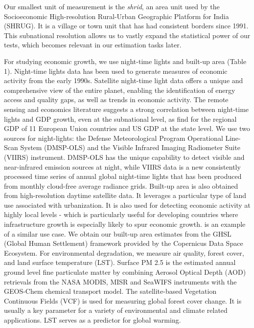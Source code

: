 \documentclass[a4paper,12pt]{article}
\begin{document}
Our smallest unit of measurement is the \textit{shrid}, an area unit used by the Socioeconomic High-resolution Rural-Urban Geographic Platform for India (SHRUG). It is a village or town unit that has had consistent borders since 1991. This subnational resolution allows us to vastly expand the statistical power of our tests, which becomes relevant in our estimation tasks later.

For studying economic growth, we use night-time lights and built-up area (Table 1). Night-time lights data has been used to generate measures of economic activity from the early 1990s. Satellite night-time light data offers a unique and comprehensive view of the entire planet, enabling the identification of energy access and quality gaps, as well as trends in economic activity. The remote sensing and economics literature suggests a strong correlation between night-time lights and GDP growth, even at the subnational level, as \textcite{doll2006} find for the regional GDP of 11 European Union countries and US GDP at the state level. We use two sources for night-lights: the Defense Meteorological Program Operational Line-Scan System (DMSP-OLS) and the Visible Infrared Imaging Radiometer Suite (VIIRS) instrument. DMSP-OLS has the unique capability to detect visible and near-infrared emission sources at night, while VIIRS data is a new consistently processed time series of annual global night-time lights that has been produced from monthly cloud-free average radiance grids.
Built-up area is also obtained from high-resolution daytime satellite data. It leverages a particular type of land use associated with urbanization. It is also used for detecting economic activity at highly local levels - which is particularly useful for developing countries where infrastructure growth is especially likely to spur economic growth. \textcite{baragwanath2021} is an example of a similar use case. We obtain our built-up area estimates from the GHSL (Global Human Settlement) framework provided by the Copernicus Data Space Ecosystem.
For environmental degradation, we measure air quality, forest cover, and land surface temperature (LST). Surface PM 2.5 is the estimated annual ground level fine particulate matter by combining Aerosol Optical Depth (AOD) retrievals from the NASA MODIS, MISR and SeaWIFS instruments with the GEOS-Chem chemical transport model. The satellite-based Vegetation Continuous Fields (VCF) is used for measuring global forest cover change. It is usually a key parameter for a variety of environmental and climate related applications. LST serves as a predictor for global warming.
\end{document}
